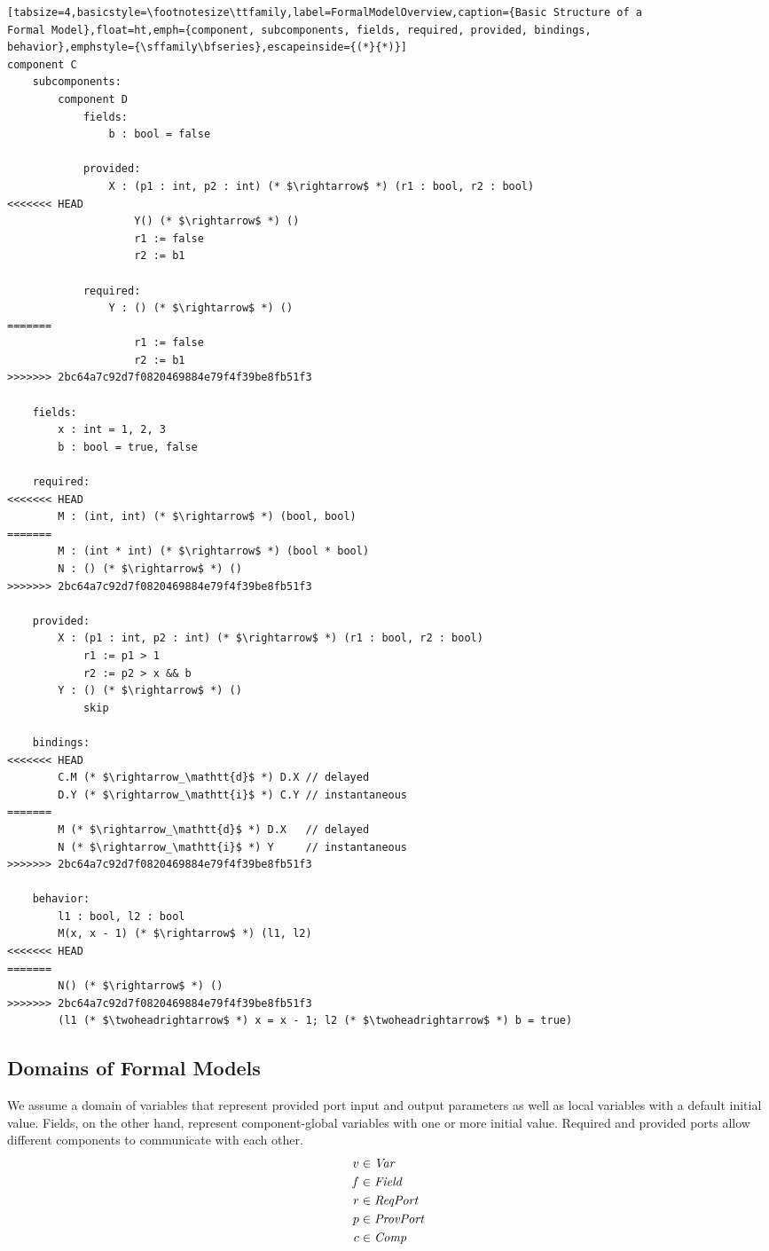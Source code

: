 \documentclass[a4paper,10pt,english]{article}
\begin{document}
\begin{lstlisting}[tabsize=4,basicstyle=\footnotesize\ttfamily,label=FormalModelOverview,caption={Basic Structure of a
Formal Model},float=ht,emph={component, subcomponents, fields, required, provided, bindings,
behavior},emphstyle={\sffamily\bfseries},escapeinside={(*}{*)}]
component C
	subcomponents:
		component D
			fields:
				b : bool = false
				
			provided:
				X : (p1 : int, p2 : int) (* $\rightarrow$ *) (r1 : bool, r2 : bool)
<<<<<<< HEAD
					Y() (* $\rightarrow$ *) ()
					r1 := false
					r2 := b1
					
			required:
				Y : () (* $\rightarrow$ *) ()
=======
					r1 := false
					r2 := b1
>>>>>>> 2bc64a7c92d7f0820469884e79f4f39be8fb51f3

	fields:
		x : int = 1, 2, 3
		b : bool = true, false
		
	required:
<<<<<<< HEAD
		M : (int, int) (* $\rightarrow$ *) (bool, bool)
=======
		M : (int * int) (* $\rightarrow$ *) (bool * bool)
		N : () (* $\rightarrow$ *) ()
>>>>>>> 2bc64a7c92d7f0820469884e79f4f39be8fb51f3
		
	provided:
		X : (p1 : int, p2 : int) (* $\rightarrow$ *) (r1 : bool, r2 : bool)
			r1 := p1 > 1
			r2 := p2 > x && b
		Y : () (* $\rightarrow$ *) ()
			skip
		
	bindings:
<<<<<<< HEAD
		C.M (* $\rightarrow_\mathtt{d}$ *) D.X // delayed
		D.Y (* $\rightarrow_\mathtt{i}$ *) C.Y // instantaneous
=======
		M (* $\rightarrow_\mathtt{d}$ *) D.X   // delayed
		N (* $\rightarrow_\mathtt{i}$ *) Y     // instantaneous
>>>>>>> 2bc64a7c92d7f0820469884e79f4f39be8fb51f3
	
	behavior:
		l1 : bool, l2 : bool
		M(x, x - 1) (* $\rightarrow$ *) (l1, l2)
<<<<<<< HEAD
=======
		N() (* $\rightarrow$ *) ()
>>>>>>> 2bc64a7c92d7f0820469884e79f4f39be8fb51f3
		(l1 (* $\twoheadrightarrow$ *) x = x - 1; l2 (* $\twoheadrightarrow$ *) b = true)
\end{lstlisting}

\subsection{Domains of Formal Models}
We assume a domain of variables that represent provided port input and output parameters as well as local variables with a default
initial value. Fields, on the other hand, represent component-global variables with one or more initial value. Required and
provided ports allow different components to communicate with each other.
\begin{align*}
	v &\in \mathit{Var} \\
	f &\in \mathit{Field} \\
	r &\in \mathit{ReqPort} \\
	p &\in \mathit{ProvPort} \\
	c&\in \mathit{Comp}
\end{align*}
\end{document}
